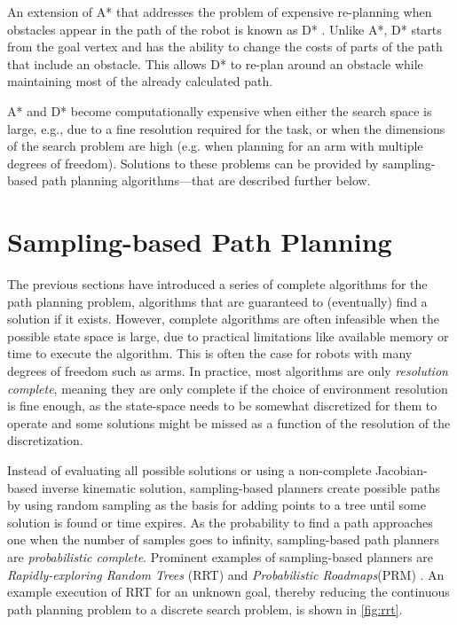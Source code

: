 An extension of A* that addresses the problem of expensive re-planning when obstacles appear in the path of the robot is known as D* \cite{stentz1994optimal}. Unlike A*, D* starts from the goal vertex and has the ability to change the costs of parts of the path that include an obstacle. This allows D* to re-plan around an obstacle while maintaining most of the already calculated path.

A* and D* become computationally expensive when either the search space is large, e.g., due to a fine resolution required for the task, or when the dimensions of the search problem are high (e.g. when planning for an arm with multiple degrees of freedom). Solutions to these problems can be provided by sampling-based path planning algorithms---that are described further below.

\section{Sampling-based Path Planning}

The previous sections have introduced a series of complete algorithms for the path planning problem, algorithms that are guaranteed to (eventually) find a solution if it exists. However, complete algorithms are often infeasible when the possible state space is large, due to practical limitations like available memory or time to execute the algorithm. This is often the case for robots with many degrees of freedom such as arms. In practice, most algorithms are only \textsl{resolution complete}, meaning they are only complete if the choice of environment resolution is fine enough, as the state-space needs to be somewhat discretized for them to operate and some solutions might be missed as a function of the resolution of the discretization.

Instead of evaluating all possible solutions or using a non-complete Jacobian-based inverse kinematic solution, sampling-based planners create possible paths by using random sampling as the basis for adding points to a tree until some solution is found or time expires. As the probability to find a path approaches one when the number of samples goes to infinity, sampling-based path planners are \textsl{probabilistic complete}. Prominent examples of sampling-based planners are \textsl{Rapidly-exploring Random Trees} (RRT)\cite{lavalle1998rapidly} and \textsl{Probabilistic Roadmaps}(PRM) \cite{kavraki1996probabilistic}. An example execution of RRT for an unknown goal, thereby reducing the continuous path planning problem to a discrete search problem, is shown in \cref{fig:rrt}.

